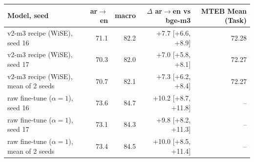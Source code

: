 \begin{tabular}{@{}lrrrr@{}}
\toprule
Model, seed & ar$\to$en & macro & $\Delta$ ar$\to$en vs bge-m3 & MTEB Mean (Task) \\
\midrule
v2-m3 recipe (WiSE), seed 16 & 71.1 & 82.2 & +7.7 [+6.6, +8.9] & 72.28 \\
v2-m3 recipe (WiSE), seed 17 & 70.3 & 82.0 & +7.0 [+5.8, +8.1] & 72.27 \\
v2-m3 recipe (WiSE), mean of 2 seeds & 70.7 & 82.1 & +7.3 [+6.2, +8.4] & 72.27 \\
\midrule
raw fine-tune ($\alpha{=}1$), seed 16 & 73.6 & 84.7 & +10.2 [+8.7, +11.8] & -- \\
raw fine-tune ($\alpha{=}1$), seed 17 & 73.1 & 84.3 & +9.8 [+8.2, +11.3] & -- \\
raw fine-tune ($\alpha{=}1$), mean of 2 seeds & 73.4 & 84.5 & +10.0 [+8.5, +11.4] & -- \\
\bottomrule
\end{tabular}

